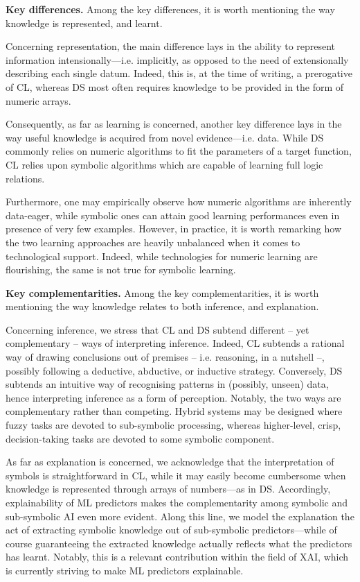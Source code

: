 \documentclass[12pt]{scrartcl}
\begin{document}
\indent\textbf{\textsf{Key differences.}}
%
Among the key differences, it is worth mentioning the way knowledge is represented, and learnt.

Concerning representation, the main difference lays in the ability to represent information intensionally---i.e. implicitly, as opposed to the need of extensionally describing each single datum.
%
Indeed, this is, at the time of writing, a prerogative of CL, whereas DS most often requires knowledge to be provided in the form of numeric arrays.

Consequently, as far as learning is concerned, another key difference lays in the way useful knowledge is acquired from novel evidence---i.e. data.
%
While DS commonly relies on numeric algorithms to fit the parameters of a target function, CL relies upon symbolic algorithms which are capable of learning full logic relations.

Furthermore, one may empirically observe how numeric algorithms are inherently data-eager, while symbolic ones can attain good learning performances even in presence of very few examples.
%
However, in practice, it is worth remarking how the two learning approaches are heavily unbalanced when it comes to technological support.
%
Indeed, while technologies for numeric learning are flourishing, the same is not true for symbolic learning.

\indent\textbf{\textsf{Key complementarities.}}
%
Among the key complementarities, it is worth mentioning the way knowledge relates to both inference, and explanation.

Concerning inference, we stress that CL and DS subtend different -- yet complementary -- ways of interpreting inference.
%
Indeed, CL subtends a rational way of drawing conclusions out of premises -- i.e. reasoning, in a nutshell --, possibly following a deductive, abductive, or inductive strategy.
%
Conversely, DS subtends an intuitive way of recognising patterns in (possibly, unseen) data, hence interpreting inference as a form of perception.
%
Notably, the two ways are complementary rather than competing.
%
Hybrid systems may be designed where fuzzy tasks are devoted to sub-symbolic processing, whereas higher-level, crisp, decision-taking tasks are devoted to some symbolic component.

As far as explanation is concerned, we acknowledge that the interpretation of symbols is straightforward in CL, while it may easily become cumbersome when knowledge is represented through arrays of numbers---as in DS.
%
Accordingly, explainability of ML predictors makes the complementarity among symbolic and sub-symbolic AI even more evident.
%
Along this line, we model the explanation the act of extracting symbolic knowledge out of sub-symbolic predictors---while of course guaranteeing the extracted knowledge actually reflects what the predictors has learnt.
%
Notably, this is a relevant contribution within the field of XAI, which is currently striving to make ML predictors explainable.
\end{document}
